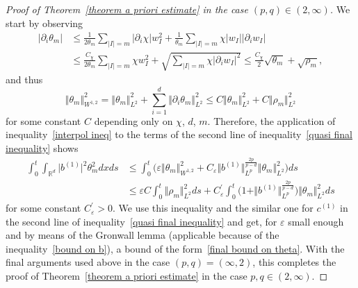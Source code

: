 \documentclass[a4paper,10pt]{article}
\newcommand\1{\mathbbm{1}}
\numberwithin{equation}{section}
\begin{document}
\begin{proof}[Proof of Theorem~\ref{theorem a priori estimate} in the case
$(p,q) \in (2,\infty)$]
We start by observing
\begin{align*}
\vert \partial_{i}\theta_{m}\vert  &  \leq\frac{1}{2\theta_{m}} 
\sum_{\vert I\vert =m} \vert \partial_{i}\chi \vert
w_{I}^{2}+\frac{1}{\theta_{m}}\sum_{\vert I\vert =m}\chi\vert
w_{I}\vert \vert \partial_{i}w_{I}\vert \\
& \leq\frac{C_{\chi}}{2\theta_{m}}\sum_{\vert I \vert =m}\chi
w_{I}^{2}+\sqrt{\sum_{\vert I \vert =m}\chi \vert \partial
_{i}w_{I} \vert ^{2}}
\leq\frac{C_{\chi}}{2}\sqrt{\theta_{m}}+\sqrt{\rho_{m}},
\end{align*}
and thus
\[
\Vert \theta_{m} \Vert _{W^{1,2}}^{2}= \Vert \theta
_{m} \Vert_{L^{2}}^{2}+\sum_{i=1}^{d} \Vert \partial_{i}\theta
_{m} \Vert _{L^{2}}^{2}\leq C \Vert \theta_{m} \Vert _{L^{2} 
}^{2}+C \Vert \rho_{m} \Vert _{L^{2}}^{2} 
\]
for some constant $C$ depending only on $\chi$, $d$, $m$. Therefore, the application of inequality~\eqref{interpol ineq} to the terms of the second line of inequality~\eqref{quasi final inequality} shows
\begin{align*}
\int_{0}^{t}\int_{\mathbb{R}^{d}} \vert b^{(1)} \vert
^{2}\theta_{m}^{2}dxds &  \leq\int_{0}^{t} \Big(\varepsilon \Vert
\theta_{m} \Vert _{W^{1,2}}^{2}+C_{\varepsilon} \Vert b^{(
1)} \Vert _{L^{p}}^{\frac{2p}{p-d}} \Vert \theta
_{m} \Vert _{L^{2}}^{2} \Big)  ds\\
&  \leq\varepsilon C\int_{0}^{t} \Vert \rho_{m} \Vert _{L^{2}} 
^{2}ds+C_{\varepsilon}^{\prime}\int_{0}^{t} \Big( 1+ \Vert b^{(1)
}\Vert _{L^{p}}^{\frac{2p}{p-d}} \Big) \Vert \theta_{m} \Vert
_{L^{2}}^{2}ds
\end{align*}
for some constant $C_{\varepsilon}^{\prime}>0$. We use this inequality and the
similar one for $c^{(1)}$ in the second line of inequality~\eqref{quasi final inequality} and get, for $\varepsilon$ small enough and by
means of the Gronwall lemma (applicable because of the inequality~\eqref{bound on b}), a
bound of the form~\eqref{final bound on theta}. With the final arguments used
above in the case $(p,q)=(\infty,2)$, this completes the proof of Theorem~\ref{theorem a priori estimate} in the case $p,q\in(2,\infty)$.
\end{proof}
\end{document}

